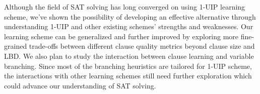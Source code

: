 \documentclass[runningheads]{llncs}
\begin{document}
Although the field of SAT solving has long converged on using 1-UIP learning scheme, we've shown the possibility of developing an effective alternative through understanding 1-UIP and other existing schemes' strengths and weaknesses.  Our learning scheme can be generalized and further improved by exploring more fine-grained trade-offs between different clause quality metrics beyond clause size and LBD. We also plan to study the interaction between clause learning and variable branching. Since most of the branching heuristics are tailored for 1-UIP scheme, the interactions with other learning schemes still need further exploration which could advance our understanding of SAT solving.  

{}

\end{document}
